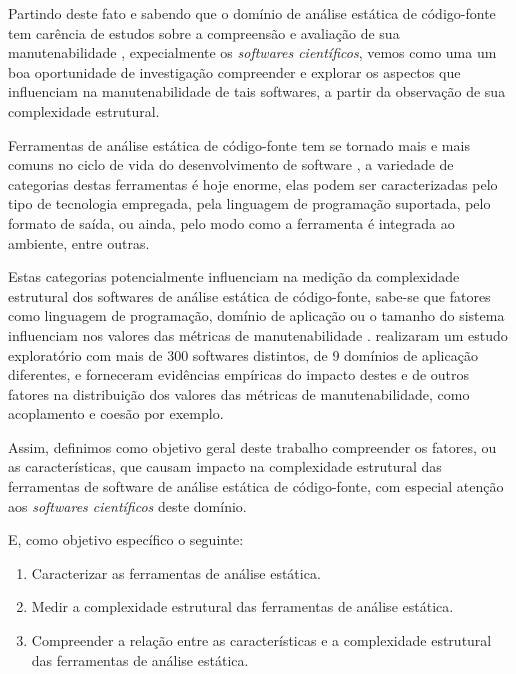 Partindo deste fato e sabendo que o domínio de análise estática de código-fonte
tem carência de estudos sobre a compreensão e avaliação de sua manutenabilidade
\cite{Li2010}, expecialmente os {\it softwares científicos}, vemos como uma um
boa oportunidade de investigação compreender e explorar os aspectos que
influenciam na manutenabilidade de tais softwares, a partir da observação de
sua complexidade estrutural.

Ferramentas de análise estática de código-fonte tem se tornado mais e mais
comuns no ciclo de vida do desenvolvimento de software \cite{Novak2010}, a
variedade de categorias destas ferramentas é hoje enorme, elas podem ser
caracterizadas pelo tipo de tecnologia empregada, pela linguagem de programação
suportada, pelo formato de saída, ou ainda, pelo modo como a ferramenta é
integrada ao ambiente, entre outras.

Estas categorias potencialmente influenciam na medição da complexidade
estrutural dos softwares de análise estática de código-fonte, sabe-se que
fatores como linguagem de programação, domínio de aplicação ou o tamanho do
sistema influenciam nos valores das métricas de manutenabilidade
\cite{Zhang2013}.  realizaram um estudo exploratório com
mais de 300 softwares distintos, de 9 domínios de aplicação diferentes, e
forneceram evidências empíricas do impacto destes e de outros fatores na
distribuição dos valores das métricas de manutenabilidade, como acoplamento e
coesão por exemplo. 


Assim, definimos como objetivo geral deste trabalho compreender os
fatores, ou as características, que causam impacto na complexidade estrutural
das ferramentas de software de análise estática de código-fonte, com especial
atenção aos {\it softwares científicos} deste domínio.

E, como objetivo específico o seguinte:

\begin{enumerate}
  \item Caracterizar as ferramentas de análise estática.
  \item Medir a complexidade estrutural das ferramentas de análise estática.
  \item Compreender a relação entre as características e a complexidade estrutural
        das ferramentas de análise estática.
\end{enumerate}

